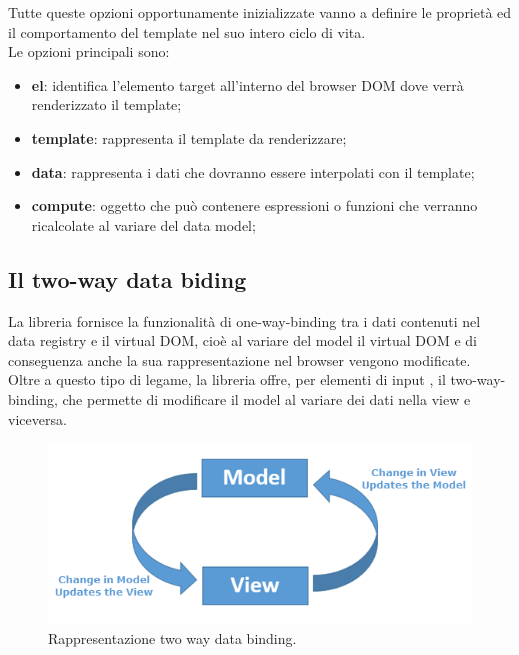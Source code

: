Tutte queste opzioni opportunamente inizializzate vanno a definire le proprietà ed il comportamento del template nel suo intero ciclo di vita.\\
Le opzioni principali sono:
\begin{itemize}
	\item \textbf{el}: identifica l'elemento target all'interno del browser DOM dove verrà renderizzato il template;
	\item \textbf{template}: rappresenta il template da renderizzare;
	\item \textbf{data}: rappresenta i dati che dovranno essere interpolati con il template;
	\item \textbf{compute}: oggetto che può contenere espressioni o funzioni che verranno ricalcolate al variare del data model;
\end{itemize}

\subsection{Il two-way data biding}
La libreria fornisce la funzionalità di one-way-binding tra i dati contenuti nel data registry e il virtual DOM, cioè al variare del model il virtual DOM e di conseguenza anche la sua rappresentazione nel browser vengono modificate.\\
Oltre a questo tipo di legame, la libreria offre, per elementi di input , il two-way-binding, che permette di modificare il model al variare dei dati nella view e viceversa.
\begin{figure}[htp]
	\centering
	\includegraphics[width=\textwidth/2]{../immagini/twoWayBinding}
	\caption{Rappresentazione two way data binding.}
\end{figure}
